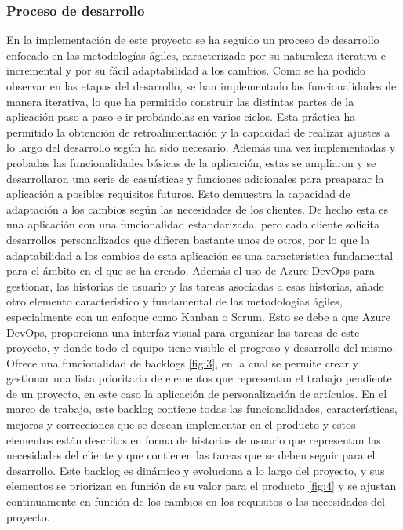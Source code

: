 \documentclass[12pt]{article}
\begin{document}
\subsubsection{Proceso de desarrollo}
En la implementación de este proyecto se ha seguido un proceso de desarrollo enfocado en las metodologías ágiles, caracterizado por su naturaleza iterativa e incremental y por su fácil adaptabilidad a los cambios. Como se ha podido observar en las etapas del desarrollo,
se han implementado las funcionalidades de manera iterativa, lo que ha permitido construir las distintas partes de la aplicación paso a paso e ir probándolas en varios ciclos.
Esta práctica ha permitido la obtención de retroalimentación y la capacidad de realizar ajustes a lo largo del desarrollo según ha sido necesario.
Además una vez implementadas y probadas las funcionalidades básicas de la aplicación, estas se ampliaron y se desarrollaron una serie de casuísticas y funciones adicionales para preaparar la aplicación a posibles
requisitos futuros. Esto demuestra la capacidad de adaptación a los cambios según las necesidades de los clientes. De hecho esta es una aplicación con una funcionalidad estandarizada, pero 
cada cliente solicita desarrollos personalizados que difieren bastante unos de otros, por lo que la adaptabilidad a los cambios de esta aplicación es una característica fundamental para el ámbito en el que se ha creado.
Además el uso de Azure DevOps para gestionar, las historias de usuario y las tareas asociadas a esas historias, añade otro elemento característico y fundamental de las metodologías ágiles, especialmente con un enfoque como Kanban o Scrum.
Esto se debe a que Azure DevOps, proporciona una interfaz visual para organizar las tareas de este proyecto, y donde todo el equipo tiene visible el progreso y desarrollo del mismo.
Ofrece una funcionalidad de backlogs \ref{fig:3}, en la cual se permite crear y gestionar una lista prioritaria de elementos que representan el trabajo pendiente de un proyecto, en este caso la aplicación de personalización de artículos. En el marco de trabajo, este backlog contiene todas las funcionalidades, características, mejoras y correcciones que se desean implementar
en el producto y estos elementos están descritos en forma de historias de usuario que representan las necesidades del cliente y que contienen las tareas que se deben seguir para el desarrollo.
Este backlog es dinámico y evoluciona a lo largo del proyecto, y sus elementos se priorizan en función de su valor para el producto \ref{fig:4} y se ajustan continuamente en función de los cambios en los requisitos o las necesidades del proyecto.
\end{document}
